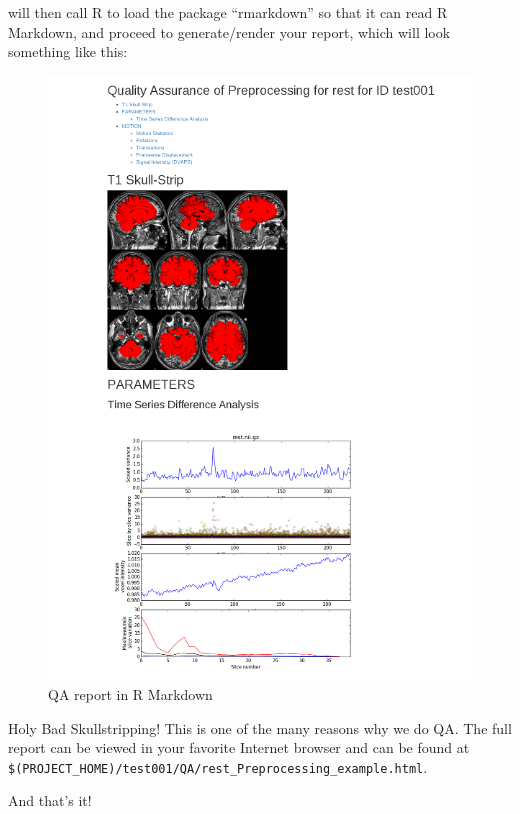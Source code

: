 \maken{} will then call R to load the package ``rmarkdown'' so that it can read R Markdown, and proceed to generate/render your report, which will look something like this: 

\begin{figure}
	\begin{center}
		\includegraphics[scale=.6]{images/QAcropped.png}
		\caption{QA report in R Markdown}
	\end{center}
\end{figure}

Holy Bad Skullstripping! This is one of the many reasons why we do QA. The full report can be viewed in your favorite Internet browser and can be found at \texttt{\$(PROJECT\_HOME)/test001/QA/rest\_Preprocessing\_example.html}. 
 
And that's it! 





